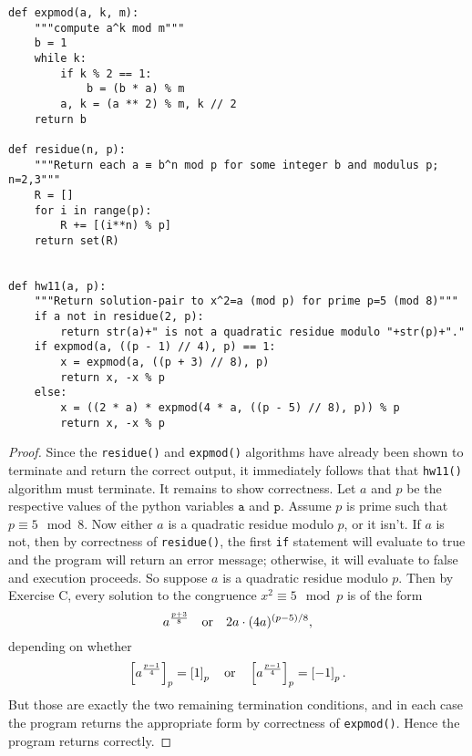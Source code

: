 \documentclass[10pt]{article}
\begin{document}
\begin{enumerate}[itemsep=1em,label=\Alph*.,leftmargin=*]
\begin{lstlisting}
def expmod(a, k, m):
    """compute a^k mod m"""
    b = 1
    while k:
        if k % 2 == 1:
            b = (b * a) % m
        a, k = (a ** 2) % m, k // 2
    return b

def residue(n, p):
    """Return each a ≡ b^n mod p for some integer b and modulus p; n=2,3"""
    R = []
    for i in range(p):
        R += [(i**n) % p]
    return set(R)


def hw11(a, p):
    """Return solution-pair to x^2=a (mod p) for prime p=5 (mod 8)"""
    if a not in residue(2, p):
        return str(a)+" is not a quadratic residue modulo "+str(p)+"." 
    if expmod(a, ((p - 1) // 4), p) == 1:
        x = expmod(a, ((p + 3) // 8), p)
        return x, -x % p
    else:
        x = ((2 * a) * expmod(4 * a, ((p - 5) // 8), p)) % p
        return x, -x % p
\end{lstlisting}

\begin{proof}
    Since the \texttt{residue()} and \texttt{expmod()} algorithms have already been shown to terminate and return the correct output, it immediately follows that that \texttt{hw11()} algorithm must terminate. It remains to show correctness. Let $a$ and $p$ be the respective values of the python variables $\texttt{a}$ and $\texttt{p}$. Assume $p$ is prime such that $p \equiv 5 \mod{8}$. Now either $a$ is a quadratic residue modulo $p$, or it isn't. If $a$ is not, then by correctness of \texttt{residue()}, the first \texttt{if} statement will evaluate to true and the program will return an error message; otherwise, it will evaluate to false and execution proceeds. So suppose $a$ is a quadratic residue modulo $p$. Then by Exercise C, every solution to the congruence $x^2 \equiv 5 \mod{p}$ is of the form
    \[a^{\frac{p+3}{8}} \quad \textnormal{or} \quad 2a\cdot(4a)^{(p-5)/8},\] depending on whether 
    \[\left[{a^{\frac{p-1}{4}}}\right]_{{p}} = \left[{1}\right]_{{p}} \quad \textnormal{or} \quad \left[{a^{\frac{p-1}{4}}}\right]_{{p}} = \left[{-1}\right]_{{p}}.\]
    But those are exactly the two remaining termination conditions, and in each case the program returns the appropriate form by correctness of \texttt{expmod()}. Hence the program returns correctly.
\end{proof}



\end{enumerate}
\end{document}
